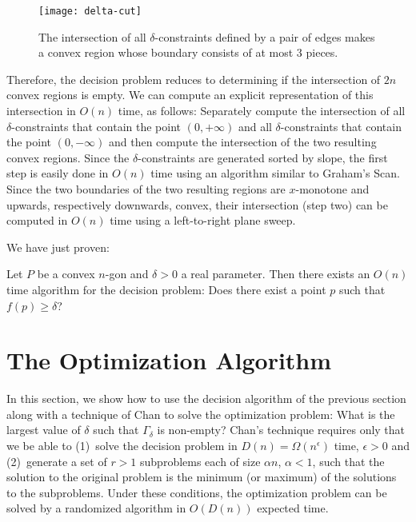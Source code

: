 \documentclass{ws-ijcga}
\begin{document}
\begin{figure}[b]
\begin{center}\texttt{[image: delta-cut]}\end{center}
\caption{The intersection of all $\delta$-constraints defined by a
pair of edges makes a convex region whose boundary consists of at
most 3 pieces.}
\end{figure}

Therefore, the decision problem reduces to determining if the
intersection of $2n$ convex regions is empty.  We can compute an
explicit representation of this intersection in $O(n)$ time, as
follows: Separately compute the intersection of all
$\delta$-constraints that contain the point $(0,+\infty)$ and all
$\delta$-constraints that contain the point $(0,-\infty)$ and then
compute the intersection of the two resulting convex regions.  Since
the $\delta$-constraints are generated sorted by slope, the first step
is easily done in $O(n)$ time using an algorithm similar to Graham's
Scan.\cite{a79,g72}  Since the two boundaries of the two resulting
regions are $x$-monotone and upwards, respectively downwards, convex,
their intersection (step two) can be computed in $O(n)$ time using a
left-to-right plane sweep.\cite{bo79}

We have just proven:

\begin{theorem}
Let $P$ be a convex $n$-gon and $\delta>0$ a real parameter.  Then
there exists an $O(n)$ time algorithm for the decision problem: Does
there exist a point $p$ such that $f(p)\ge\delta$?
\end{theorem}

\section{The Optimization Algorithm}

In this section, we show how to use the decision algorithm of the
previous section along with a technique of Chan\cite{c99} to solve the
optimization problem: What is the largest value of $\delta$ such that
$\Gamma_\delta$ is non-empty?  Chan's technique requires only that we
be able to (1)~solve the decision problem in $D(n)=\Omega(n^\epsilon)$
time, $\epsilon>0$ and (2)~generate a set of $r>1$ subproblems each of
size $\alpha n$, $\alpha <1$, such that the solution to the original
problem is the minimum (or maximum) of the solutions to the
subproblems.  Under these conditions, the optimization problem can be
solved by a randomized algorithm in $O(D(n))$ expected time.
\end{document}
